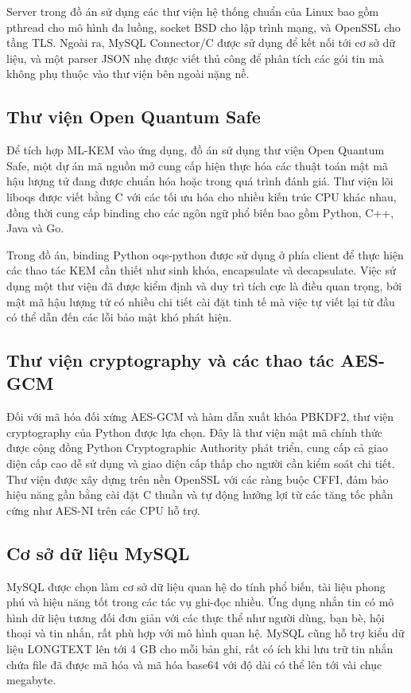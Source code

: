 Server trong đồ án sử dụng các thư viện hệ thống chuẩn của Linux bao gồm pthread cho mô hình đa luồng, socket BSD cho lập trình mạng, và OpenSSL cho tầng TLS. Ngoài ra, MySQL Connector/C được sử dụng để kết nối tới cơ sở dữ liệu, và một parser JSON nhẹ được viết thủ công để phân tích các gói tin mà không phụ thuộc vào thư viện bên ngoài nặng nề.

\subsection{Thư viện Open Quantum Safe}

Để tích hợp ML-KEM vào ứng dụng, đồ án sử dụng thư viện Open Quantum Safe, một dự án mã nguồn mở cung cấp hiện thực hóa các thuật toán mật mã hậu lượng tử đang được chuẩn hóa hoặc trong quá trình đánh giá. Thư viện lõi liboqs được viết bằng C với các tối ưu hóa cho nhiều kiến trúc CPU khác nhau, đồng thời cung cấp binding cho các ngôn ngữ phổ biến bao gồm Python, C++, Java và Go.

Trong đồ án, binding Python oqs-python được sử dụng ở phía client để thực hiện các thao tác KEM cần thiết như sinh khóa, encapsulate và decapsulate. Việc sử dụng một thư viện đã được kiểm định và duy trì tích cực là điều quan trọng, bởi mật mã hậu lượng tử có nhiều chi tiết cài đặt tinh tế mà việc tự viết lại từ đầu có thể dẫn đến các lỗi bảo mật khó phát hiện.

\subsection{Thư viện cryptography và các thao tác AES-GCM}

Đối với mã hóa đối xứng AES-GCM và hàm dẫn xuất khóa PBKDF2, thư viện cryptography của Python được lựa chọn. Đây là thư viện mật mã chính thức được cộng đồng Python Cryptographic Authority phát triển, cung cấp cả giao diện cấp cao dễ sử dụng và giao diện cấp thấp cho người cần kiểm soát chi tiết. Thư viện được xây dựng trên nền OpenSSL với các ràng buộc CFFI, đảm bảo hiệu năng gần bằng cài đặt C thuần và tự động hưởng lợi từ các tăng tốc phần cứng như AES-NI trên các CPU hỗ trợ.

\subsection{Cơ sở dữ liệu MySQL}

MySQL được chọn làm cơ sở dữ liệu quan hệ do tính phổ biến, tài liệu phong phú và hiệu năng tốt trong các tác vụ ghi-đọc nhiều. Ứng dụng nhắn tin có mô hình dữ liệu tương đối đơn giản với các thực thể như người dùng, bạn bè, hội thoại và tin nhắn, rất phù hợp với mô hình quan hệ. MySQL cũng hỗ trợ kiểu dữ liệu LONGTEXT lên tới 4 GB cho mỗi bản ghi, rất có ích khi lưu trữ tin nhắn chứa file đã được mã hóa và mã hóa base64 với độ dài có thể lên tới vài chục megabyte.

